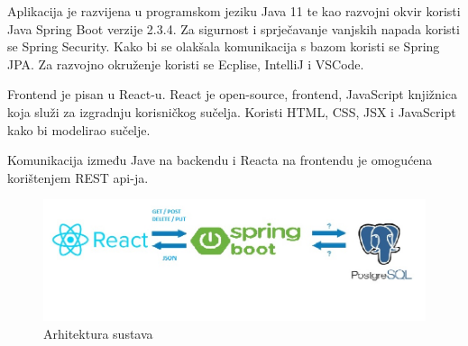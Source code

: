 		Aplikacija je razvijena u programskom jeziku Java 11 te kao razvojni okvir koristi Java Spring Boot verzije 2.3.4. Za sigurnost i sprječavanje vanjskih napada koristi se Spring Security.
		Kako bi se olakšala komunikacija s bazom koristi se Spring JPA.  
		Za razvojno okruženje koristi se Ecplise, IntelliJ i VSCode.
		 
		
		Frontend je pisan u  React-u. React je open-source, frontend, JavaScript knjižnica koja služi  za izgradnju korisničkog sučelja. Koristi HTML, CSS, JSX i JavaScript kako bi modelirao sučelje.
		
		Komunikacija između Jave na backendu i Reacta na frontendu je omogućena korištenjem REST api-ja.
		\begin{figure}[H]
			\includegraphics[scale=0.7]{slike/arhitektura2.jpg} %
			\centering
			\caption {Arhitektura sustava}
			\label{fig:promjene}
		\end{figure}
	
